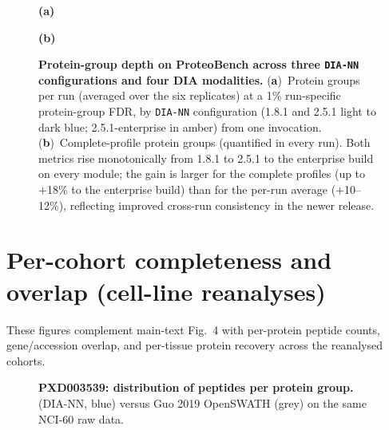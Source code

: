 \documentclass[preprint,12pt]{elsarticle}
\begin{document}
\begin{figure}[htbp]
  \centering
  \textbf{(a)}\par\vspace{0.1em}
  \par
  \vspace{0.5em}
  \textbf{(b)}\par\vspace{0.1em}
  \caption[ProteoBench protein groups across DIA-NN versions]{%
    \textbf{Protein-group depth on ProteoBench across three \texttt{DIA-NN}
    configurations and four DIA modalities.}
    (\textbf{a})~Protein groups per run (averaged over the six replicates) at a
    1\% run-specific protein-group FDR, by \texttt{DIA-NN} configuration (1.8.1
    and 2.5.1 light to dark blue; 2.5.1-enterprise in amber) from one
    \quantmsdiann{} invocation.
    (\textbf{b})~Complete-profile protein groups (quantified in every run).
    Both metrics rise monotonically from 1.8.1 to 2.5.1 to the enterprise build
    on every module; the gain is larger for the complete profiles (up to
    $+$18\% to the enterprise build) than for the per-run average ($+$10--12\%),
    reflecting improved cross-run consistency in the newer release.
  }
  \label{fig:supp-proteobench-proteins}
\end{figure}


\section{Per-cohort completeness and overlap (cell-line reanalyses)}
\label{sec:supp-reanalyses}

These figures complement main-text Fig.~4 with per-protein peptide counts, gene/accession overlap, and per-tissue protein recovery across the reanalysed cohorts.

\begin{figure}[htbp]
  \centering
  \caption[PXD003539 peptides per protein]{%
    \textbf{PXD003539: distribution of peptides per protein group.}
    \quantmsdiann{} (DIA-NN, blue) versus Guo 2019 OpenSWATH (grey)
    on the same NCI-60 raw data.
  }
  \label{fig:supp-pxd003539-peptides}
\end{figure}
\end{document}
